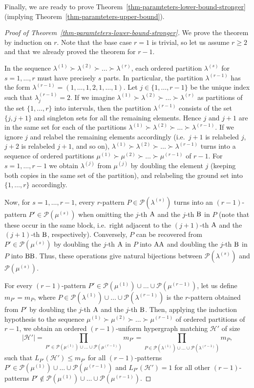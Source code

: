 \documentclass{aic}
\theoremstyle{definition}
\numberwithin{equation}{section}
\numberwithin{figure}{section}
\newcommand{\HH}{\mathcal{H}}
\newcommand{\PP}{\mathcal{P}}
\begin{document}
Finally, we are ready to prove Theorem~\ref{thm-paramteters-lower-bound-stronger} (implying Theorem~\ref{thm-paramteters-upper-bound}).

\begin{proof}[Proof of Theorem~\ref{thm-paramteters-lower-bound-stronger}]
We prove the theorem by induction on $r$. Note that the base case $r=1$ is trivial, so let us assume $r\ge 2$ and that we already proved the theorem for $r-1$.

In the sequence $\lambda^{(1)} \succ \lambda^{(2)} \succ \dots \succ \lambda^{(r)}$, each ordered partition $\lambda^{(s)}$ for $s=1,\dots,r$ must have precisely $s$ parts. In particular, the partition $\lambda^{(r-1)}$ has the form $\lambda^{(r-1)}=(1,\dots,1,2,1,\dots,1)$. Let $j\in \{1,\dots,r-1\}$ be the unique index such that $\lambda^{(r-1)}_j=2$. If we imagine $\lambda^{(1)} \succ \lambda^{(2)} \succ \dots \succ \lambda^{(r)}$ as partitions of the set $\{1,\dots,r\}$ into intervals, then the partition  $\lambda^{(r-1)}$ consists of the set $\{j,j+1\}$ and singleton sets for all the remaining elements. Hence $j$ and $j+1$ are in the same set for each of the partitions $\lambda^{(1)} \succ \lambda^{(2)} \succ \dots \succ \lambda^{(r-1)}$. If we ignore $j$ and relabel the remaining elements accordingly (i.e.\ $j+1$ is relabeled $j$, $j+2$ is relabeled $j+1$, and so on), $\lambda^{(1)} \succ \lambda^{(2)} \succ \dots \succ \lambda^{(r-1)}$ turns into a sequence of ordered partitions $\mu^{(1)} \succ \mu^{(2)} \succ \dots \succ \mu^{(r-1)}$ of $r-1$. For $s=1,\dots,r-1$ we obtain $\lambda^{(j)}$ from $\mu^{(j)}$ by doubling the element $j$ (keeping both copies in the same set of the partition), and relabeling the ground set into $\{1,\dots,r\}$ accordingly.

Now, for $s=1,\dots,r-1$, every $r$-pattern $P\in \PP(\lambda^{(s)})$ turns into an $(r-1)$-pattern $P'\in \PP(\mu^{(s)})$ when omitting the $j$-th $\rm A$ and the $j$-th $\rm B$ in $P$ (note that these occur in the same block, i.e.\ right adjacent to the $(j+1)$-th $\rm A$ and the $(j+1)$-th $\rm B$, respectively). Conversely, $P$ can be recovered from $P'\in \PP(\mu^{(s)})$ by doubling the $j$-th $\rm A$
in $P$ into $\rm{AA}$ and doubling the $j$-th $\rm B$
in $P$ into $\rm{BB}$. Thus, these operations give natural bijections between $\PP(\lambda^{(s)})$ and $\PP(\mu^{(s)})$.

For every $(r-1)$-pattern $P'\in \PP(\mu^{(1)})\cup\dots\cup \PP(\mu^{(r-1)})$, let us define $m_{P'}=m_P$, where $P\in \PP(\lambda^{(1)})\cup\dots\cup \PP(\lambda^{(r-1)})$ is the $r$-pattern obtained from $P'$ by doubling the $j$-th $\rm A$ and the $j$-th $\rm B$. Then, applying the induction hypothesis to the sequence $\mu^{(1)} \succ \mu^{(2)} \succ \dots \succ \mu^{(r-1)}$ of ordered partitions of $r-1$, we obtain an ordered $(r-1)$-uniform hypergraph matching $\HH'$ of size
\[|\HH'|=\prod_{P'\in \PP(\mu^{(1)})\cup\dots\cup \PP(\mu^{(r-1)})} m_{P'}=\prod_{P\in \PP(\lambda^{(1)})\cup\dots\cup \PP(\lambda^{(r-1)})} m_{P},\]
such that $L_{P'}(\HH')\le m_{P'}$ for all $(r-1)$-patterns $P'\in \PP(\mu^{(1)})\cup\dots\cup \PP(\mu^{(r-1)})$ and $L_{P'}(\HH')=1$ for all other $(r-1)$-patterns $P'\not\in \PP(\mu^{(1)})\cup\dots\cup \PP(\mu^{(r-1)})$.


\end{proof}
\end{document}
